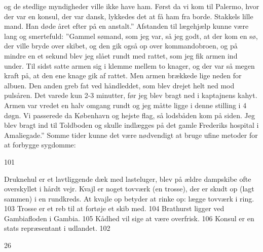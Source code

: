 og de stedlige myndigheder ville ikke have ham. Først da vi kom til
Palermo, hvor der var en konsul, der var dansk, lykkedes det at få ham
fra borde. Stakkels lille mand. Han døde året efter på en anstalt.''
Afstanden til lægehjælp kunne være lang og smertefuld: ''Gammel sømand,
som jeg var, så jeg godt, at der kom en sø, der ville bryde over skibet,
og den gik også op over kommandobroen, og på mindre en et sekund blev
jeg slået rundt med rattet, som jeg fik armen ind under. Til sidst satte
armen sig i klemme mellem to knager, og der var så megen kraft på, at
den ene knage gik af rattet. Men armen brækkede lige neden for albuen.
Den anden greb fat ved håndleddet, som blev drejet helt ned mod
pulsåren. Det varede kun 2-3 minutter, før jeg blev bragt ned i
kaptajnens kahyt. Armen var vredet en halv omgang rundt og jeg måtte
ligge i denne stilling i 4 døgn. Vi passerede da København og hejste
flag, så lodsbåden kom på siden. Jeg blev bragt ind til Toldboden og
skulle indlægges på det gamle Frederiks hospital i Amaliegade.'' Somme
tider kunne det være nødvendigt at bruge ufine metoder for at forbygge
sygdomme:

101

Druknehul er et lavtliggende dæk med lasteluger, blev på ældre dampskibe
ofte overskyllet i hårdt vejr. Kvajl er noget tovværk (en trosse), der
er skudt op (lagt sammen) i en rundkreds. At kvajle op betyder at rinke
op: lægge tovværk i ring. 103 Trosse er et reb til at fortøje et skib
med. 104 Brathurst ligger ved Gambiafloden i Gambia. 105 Kådhed vil sige
at være overfrisk. 106 Konsul er en stats repræsentant i udlandet. 102

26

